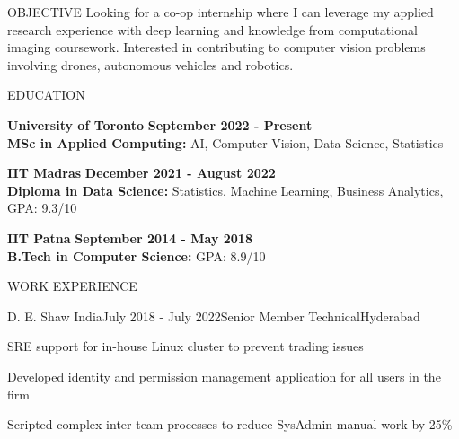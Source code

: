 \documentclass{resume}
\begin{document}
  \begin{rSection}{OBJECTIVE}
    Looking for a co-op internship where I can leverage my applied research experience with deep learning and knowledge from computational imaging coursework.
    Interested in contributing to computer vision problems involving drones, autonomous vehicles and robotics.
  \end{rSection}

  \begin{rSection}{EDUCATION}

    {\bf University of Toronto} \hfill {\bf September 2022 - Present} \\
    {\bf MSc in Applied Computing:} AI, Computer Vision, Data Science, Statistics

    {\bf IIT Madras} \hfill {\bf December 2021 - August 2022} \\
    {\bf Diploma in Data Science:} Statistics, Machine Learning, Business Analytics, GPA: 9.3/10

    {\bf IIT Patna} \hfill {\bf September 2014 - May 2018} \\
    {\bf B.Tech in Computer Science:} GPA: 8.9/10

  \end{rSection}

  \begin{rSection}{WORK EXPERIENCE}

    \begin{rSubsection}{D. E. Shaw India}{July 2018 - July 2022}{Senior Member Technical}{Hyderabad}
      \item SRE support for in-house Linux cluster to prevent trading issues
      \item Developed identity and permission management application for all users in the firm
      \item Scripted complex inter-team processes to reduce SysAdmin manual work by 25\%
    \end{rSubsection}
  
  \end{rSection}
\end{document}

